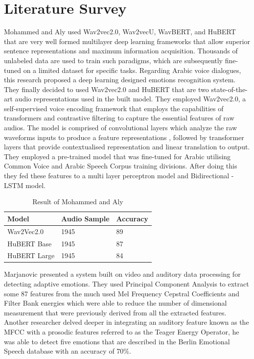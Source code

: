 \documentclass[11pt,a4paper]{article}
\begin{document}
	\section{Literature Survey}
	Mohammed and Aly \cite{mohamed2021arabic} used Wav2vec2.0, Wav2vecU, WavBERT, and HuBERT that are very well formed multilayer deep learning frameworks that allow superior sentence representations and maximum information acquisition. Thousands of unlabeled data are used to train such paradigms, which are subsequently fine-tuned on a limited dataset for specific tasks. Regarding Arabic voice dialogues, this research proposed a deep learning designed emotions recognition system. They finally decided to used Wav2vec2.0 and HuBERT  that are two state-of-the-art audio representations used in the built model. They employed Wav2vec2.0, a self-supervised voice encoding framework that employs the capabilities of transformers and contrastive filtering to capture the essential features of raw audios. The model is comprised of convolutional layers which analyze the raw waveforms inputs to produce a feature representations , followed by transformer layers that provide contextualised representation and linear translation to output. They employed a pre-trained model \cite{el-geish_2021} that was fine-tuned for Arabic utilising Common Voice and Arabic Speech Corpus training divisions. After doing this they fed these features to a multi layer perceptron model and  Bidirectional - LSTM model. 
	\begin{table}[h]
		\caption{Result of Mohammed and Aly \cite{mohamed2021arabic}}
		\begin{tabular}{|l|l|l|}
			\hline
			\textbf{Model} & \textbf{Audio Sample} & \textbf{Accuracy} \\ \hline
			Wav2Vec2.0     & 1945                  & 89                \\ \hline
			HuBERT Base    & 1945                  & 87                \\ \hline
			HuBERT Large   & 1945                  & 84                \\ \hline
		\end{tabular}
	\end{table}
Marjanovic \cite{noroozi2017audio} presented a system built on video and auditory data processing for detecting adaptive emotions. They used Principal Component Analysis to extract some 87 features from the much used Mel Frequency Cepstral Coefficients and Filter Bank energies which were able to reduce the number of dimensional  measurement that were  previously derived from all the extracted features. Another researcher \cite{bandela2017stressed} delved deeper in integrating an auditory feature known as the MFCC with a prosodic features referred to as the Teager Energy Operator, he was able to detect five emotions that are described in the Berlin Emotional Speech database with an accuracy of 70\%.
\end{document}

